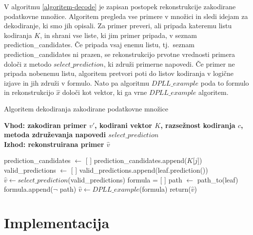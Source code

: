 \documentclass[12pt,a4paper]{article}
\begin{document}
V algoritmu \ref{algoritem-decode} je zapisan postopek rekonstrukcije zakodirane podatkovne množice.
Algoritem pregleda vse primere v množici in sledi idejam za dekodiranje, ki smo jih opisali.
Za primer preveri, ali pripada kateremu listu kodiranja $K$, in shrani vse liste, ki jim primer pripada, v seznam prediction\_candidates.
Če pripada vsaj enemu listu, tj.~seznam prediction\_candidates ni prazen, se rekonstrukcijo prvotne vrednosti primera določi z metodo $select\_prediction$, ki združi primerne napovedi.
Če primer ne pripada nobenemu listu, algoritem pretvori poti do listov kodiranja v logične izjave in jih združi v formulo.
Nato pa algoritmu $DPLL\_example$ poda to formulo in rekonstrukcijo $\hat{x}$ določi kot vektor, ki ga vrne $DPLL\_example$ algoritem.

\begin{algorithm}[h!]
	\caption{Algoritem dekodiranja zakodirane podatkovne množice}
	\label{algoritem-decode}
	\raggedright
	\textbf{Vhod: zakodiran primer $v'$, kodirani vektor $K$, razsežnost kodiranja $c$, metoda združevanja napovedi $select\_prediction$}  \\
	\textbf{Izhod: rekonstruirana primer $\hat{v}$} 
	\begin{algorithmic}[1]
			\State prediction\_candidates $\gets$ [ ]
				\State prediction\_candidates.append($K$[$j$])
			\EndIf
		\EndFor
			\State valid\_predictions $\gets$ [ ]
				\State valid\_predictions.append(leaf.prediction())
			\EndFor
			\State $\hat{v} \gets select\_prediction$(valid\_predictions) 
		\Else
			\State formula = [ ]
				\State path $\gets$ path\_to(leaf)
				\State formula.append($\lnot$ path)
			\EndFor
			\State $\hat{v} \gets DPLL\_example$(formula)
		\EndIf
		\State return($\hat{v}$)
	\end{algorithmic}
\end{algorithm}



\section{Implementacija}
\end{document}
